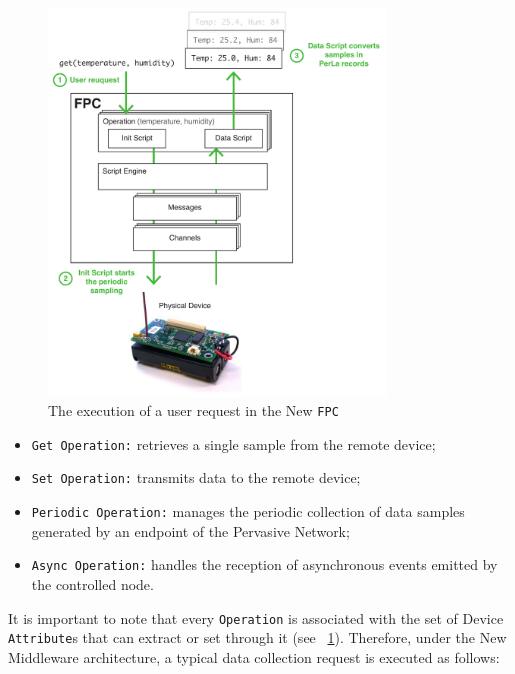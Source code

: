 \begin{figure}[h!]
\center
\includegraphics[width=0.8\textwidth]{imgs/operation_fpc.pdf}
\caption{The execution of a user request in the New \texttt{FPC}}
\label{fig:operation_fpc}
\end{figure}

\begin{itemize}

    \item \texttt{Get Operation:} retrieves a single sample from the remote
        device;

    \item \texttt{Set Operation:} transmits data to the remote device;

    \item \texttt{Periodic Operation:} manages the periodic collection of data
        samples generated by an endpoint of the Pervasive Network;

    \item \texttt{Async Operation:} handles the reception of asynchronous
        events emitted by the controlled node.

\end{itemize}

It is important to note that every \texttt{Operation} is associated with the
set of Device \texttt{Attribute}s that can extract or set through it (see
~\ref{fig:operation_fpc}). Therefore, under the New Middleware architecture, a
typical data collection request is executed as follows:

